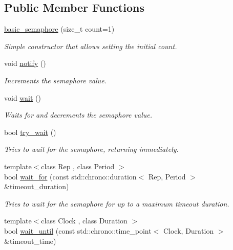 \subsection*{Public Member Functions}
\begin{DoxyCompactItemize}
\item 
\hyperlink{classcpen333_1_1thread_1_1basic__semaphore_adfcd90a6776f9bdbb580bff6d9fa2a3e}{basic\+\_\+semaphore} (size\+\_\+t count=1)
\begin{DoxyCompactList}\small\item\em Simple constructor that allows setting the initial count. \end{DoxyCompactList}\item 
void \hyperlink{classcpen333_1_1thread_1_1basic__semaphore_a0b5032fc8df915cb51276411b1153b84}{notify} ()
\begin{DoxyCompactList}\small\item\em Increments the semaphore value. \end{DoxyCompactList}\item 
void \hyperlink{classcpen333_1_1thread_1_1basic__semaphore_ac5cacef970643d393429ff87c0c6d6bf}{wait} ()
\begin{DoxyCompactList}\small\item\em Waits for and decrements the semaphore value. \end{DoxyCompactList}\item 
bool \hyperlink{classcpen333_1_1thread_1_1basic__semaphore_a72eb19243d4c55013f7fca9e5aa059f5}{try\+\_\+wait} ()
\begin{DoxyCompactList}\small\item\em Tries to wait for the semaphore, returning immediately. \end{DoxyCompactList}\item 
{\footnotesize template$<$class Rep , class Period $>$ }\\bool \hyperlink{classcpen333_1_1thread_1_1basic__semaphore_a500ae89545ae6b639ad347d50a53e2a8}{wait\+\_\+for} (const std\+::chrono\+::duration$<$ Rep, Period $>$ \&timeout\+\_\+duration)
\begin{DoxyCompactList}\small\item\em Tries to wait for the semaphore for up to a maximum timeout duration. \end{DoxyCompactList}\item 
{\footnotesize template$<$class Clock , class Duration $>$ }\\bool \hyperlink{classcpen333_1_1thread_1_1basic__semaphore_a19d3b188f86c565acbf83ec4872d9773}{wait\+\_\+until} (const std\+::chrono\+::time\+\_\+point$<$ Clock, Duration $>$ \&timeout\+\_\+time)

\end{DoxyCompactItemize}
